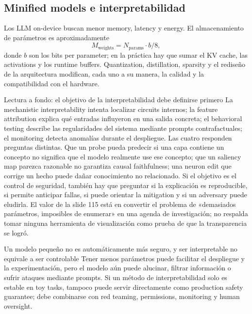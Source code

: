 \subsection{Minified models e interpretabilidad}

Los LLM on-device buscan menor memory, latency y energy. El almacenamiento de parámetros es aproximadamente
\[
M_{\text{weights}}=N_{\text{params}}\cdot b/8,
\]
donde $b$ son los bits per parameter; en la práctica hay que sumar el KV cache, las activations y los runtime buffers. Quantization, distillation, sparsity y el rediseño de la arquitectura modifican, cada uno a su manera, la calidad y la compatibilidad con el hardware.





\begin{knowledgebox}{Lectura a fondo: el objetivo de la interpretabilidad debe definirse primero}
La mechanistic interpretability intenta localizar circuits internos; la feature attribution explica qué entradas influyeron en una salida concreta; el behavioral testing describe las regularidades del sistema mediante prompts contrafactuales; el monitoring detecta anomalías durante el despliegue. Las cuatro responden preguntas distintas. Que un probe pueda predecir si una capa contiene un concepto no significa que el modelo realmente use ese concepto; que un saliency map parezca razonable no garantiza causal faithfulness; una neuron edit que corrige un hecho puede dañar conocimiento no relacionado. Si el objetivo es el control de seguridad, también hay que preguntar si la explicación es reproducible, si permite anticipar fallas, si puede orientar la mitigation y si un adversary puede eludirla. El valor de la slide 115 está en convertir el problema de «demasiados parámetros, imposibles de enumerar» en una agenda de investigación; no respalda tomar ninguna herramienta de visualización como prueba de que la transparencia se logró.
\end{knowledgebox}

\begin{warningbox}{Un modelo pequeño no es automáticamente más seguro, y ser interpretable no equivale a ser controlable}
Tener menos parámetros puede facilitar el despliegue y la experimentación, pero el modelo aún puede alucinar, filtrar información o sufrir ataques mediante prompts. Si un método de interpretabilidad solo es estable en toy tasks, tampoco puede servir directamente como production safety guarantee; debe combinarse con red teaming, permissions, monitoring y human oversight.
\end{warningbox}

